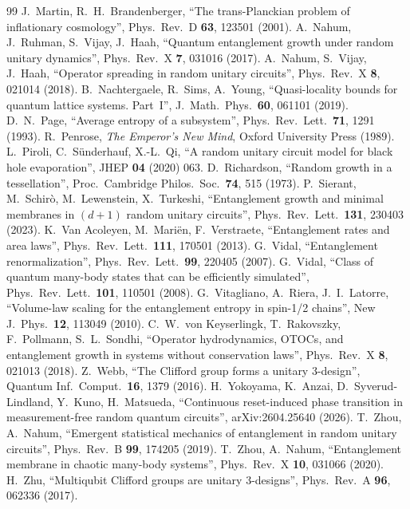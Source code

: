 \begin{thebibliography}{99}
 J.~Martin, R.~H.~Brandenberger, ``The trans-Planckian problem of inflationary cosmology'', Phys.\ Rev.\ D \textbf{63}, 123501 (2001).
 A.~Nahum, J.~Ruhman, S.~Vijay, J.~Haah, ``Quantum entanglement growth under random unitary dynamics'', Phys.\ Rev.\ X \textbf{7}, 031016 (2017).
 A.~Nahum, S.~Vijay, J.~Haah, ``Operator spreading in random unitary circuits'', Phys.\ Rev.\ X \textbf{8}, 021014 (2018).
 B.~Nachtergaele, R.~Sims, A.~Young, ``Quasi-locality bounds for quantum lattice systems. Part~I'', J.\ Math.\ Phys.\ \textbf{60}, 061101 (2019).
 D.~N.~Page, ``Average entropy of a subsystem'', Phys.\ Rev.\ Lett.\ \textbf{71}, 1291 (1993).
 R.~Penrose, \emph{The Emperor's New Mind}, Oxford University Press (1989).
 L.~Piroli, C.~S\"underhauf, X.-L.~Qi, ``A random unitary circuit model for black hole evaporation'', JHEP \textbf{04} (2020) 063.
 D.~Richardson, ``Random growth in a tessellation'', Proc.\ Cambridge Philos.\ Soc.\ \textbf{74}, 515 (1973).
 P.~Sierant, M.~Schir\`o, M.~Lewenstein, X.~Turkeshi, ``Entanglement growth and minimal membranes in $(d+1)$ random unitary circuits'', Phys.\ Rev.\ Lett.\ \textbf{131}, 230403 (2023).
 K.~Van Acoleyen, M.~Mari\"en, F.~Verstraete, ``Entanglement rates and area laws'', Phys.\ Rev.\ Lett.\ \textbf{111}, 170501 (2013).
 G.~Vidal, ``Entanglement renormalization'', Phys.\ Rev.\ Lett.\ \textbf{99}, 220405 (2007).
 G.~Vidal, ``Class of quantum many-body states that can be efficiently simulated'', Phys.\ Rev.\ Lett.\ \textbf{101}, 110501 (2008).
 G.~Vitagliano, A.~Riera, J.~I.~Latorre, ``Volume-law scaling for the entanglement entropy in spin-1/2 chains'', New J.\ Phys.\ \textbf{12}, 113049 (2010).
 C.~W.~von Keyserlingk, T.~Rakovszky, F.~Pollmann, S.~L.~Sondhi, ``Operator hydrodynamics, OTOCs, and entanglement growth in systems without conservation laws'', Phys.\ Rev.\ X \textbf{8}, 021013 (2018).
 Z.~Webb, ``The Clifford group forms a unitary 3-design'', Quantum Inf.\ Comput.\ \textbf{16}, 1379 (2016).
 H.~Yokoyama, K.~Anzai, D.~Syverud-Lindland, Y.~Kuno, H.~Matsueda, ``Continuous reset-induced phase transition in measurement-free random quantum circuits'', arXiv:2604.25640 (2026).
 T.~Zhou, A.~Nahum, ``Emergent statistical mechanics of entanglement in random unitary circuits'', Phys.\ Rev.\ B \textbf{99}, 174205 (2019).
 T.~Zhou, A.~Nahum, ``Entanglement membrane in chaotic many-body systems'', Phys.\ Rev.\ X \textbf{10}, 031066 (2020).
 H.~Zhu, ``Multiqubit Clifford groups are unitary 3-designs'', Phys.\ Rev.\ A \textbf{96}, 062336 (2017).
\end{thebibliography}
